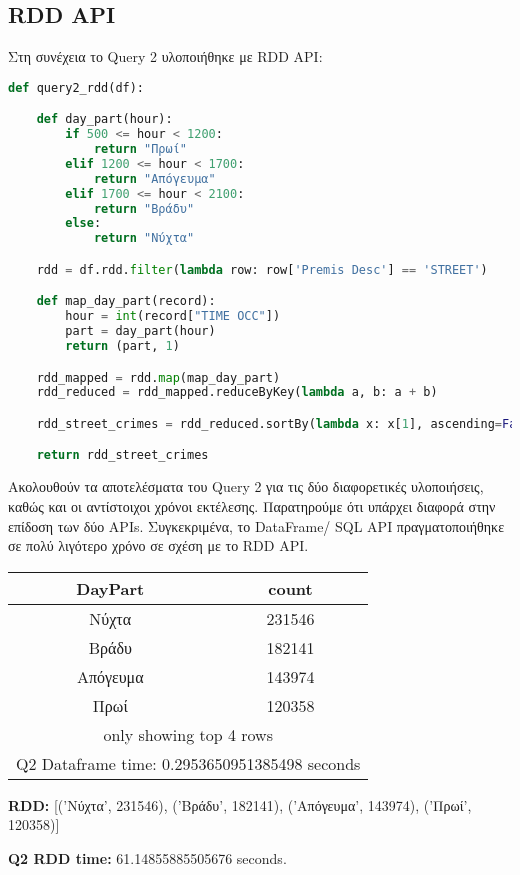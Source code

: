 \documentclass{article}
\begin{document}
\vspace{1\baselineskip}
\subsection*{RDD API}

Στη συνέχεια το Query 2 υλοποιήθηκε με RDD API:
\begin{lstlisting}[language = Python]
    def query2_rdd(df):

    def day_part(hour):
        if 500 <= hour < 1200:
            return "Πρωί"
        elif 1200 <= hour < 1700:
            return "Απόγευμα"
        elif 1700 <= hour < 2100:
            return "Βράδυ"
        else:
            return "Νύχτα"

    rdd = df.rdd.filter(lambda row: row['Premis Desc'] == 'STREET')

    def map_day_part(record):
        hour = int(record["TIME OCC"])
        part = day_part(hour)
        return (part, 1)

    rdd_mapped = rdd.map(map_day_part)
    rdd_reduced = rdd_mapped.reduceByKey(lambda a, b: a + b)

    rdd_street_crimes = rdd_reduced.sortBy(lambda x: x[1], ascending=False)

    return rdd_street_crimes 
\end{lstlisting} 


\vspace{1\baselineskip}

Ακολουθούν τα αποτελέσματα του Query 2 για τις δύο διαφορετικές υλοποιήσεις, καθώς και οι αντίστοιχοι χρόνοι εκτέλεσης. Παρατηρούμε ότι υπάρχει διαφορά στην επίδοση των δύο APIs. Συγκεκριμένα, το DataFrame/ SQL API πραγματοποιήθηκε σε πολύ λιγότερο χρόνο σε σχέση με το RDD API. 
    

\begin{center} %
\begin{tabular}{|c|c|}
\hline
\textbf{DayPart} & \textbf{count} \\
\hline
Νύχτα & 231546 \\
Βράδυ & 182141 \\
Απόγευμα & 143974 \\
Πρωί & 120358 \\
\hline
\multicolumn{2}{|c|}{only showing top 4 rows} \\
\hline
\multicolumn{2}{|c|}{Q2 Dataframe time: 0.2953650951385498 seconds} \\
\hline
\end{tabular}

\vspace{2\baselineskip}

\noindent \textbf{RDD:} [('Νύχτα', 231546), ('Βράδυ', 182141), ('Απόγευμα', 143974), ('Πρωί', 120358)]

\noindent \textbf{Q2 RDD time:} 61.14855885505676 seconds.

\end{center}
\end{document}

